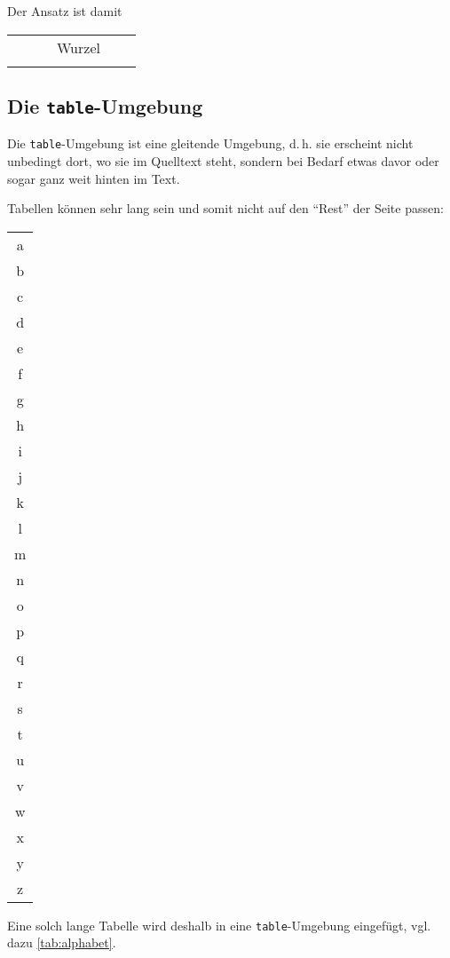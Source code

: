 \documentclass[ngerman,               %
               a4paper,               %
               fleqn,                 %
                     ]{scrartcl}       %
\begin{document}
Der Ansatz ist damit

\begin{tabular}{*{7}{p{1cm}}}  %
  \cline{4-5}         %
  &  & & \multicolumn{2}{|c|}{Wurzel} &  \\
  \cline{4-5}
  &  & & \multicolumn{1}{c|}{} & \\
\end{tabular}

\subsection{Die \texttt{table}-Umgebung}

Die \texttt{table}-Umgebung ist eine gleitende Umgebung, d.\,h. sie
erscheint nicht unbedingt dort, wo sie im Quelltext steht, sondern bei
Bedarf etwas davor oder sogar ganz weit hinten im Text.

Tabellen können sehr lang sein und somit nicht auf den "`Rest"' der Seite
passen:

\begin{tabular}{c}
  a\\
  b\\
  c\\
  d\\
  e\\
  f\\
  g\\
  h\\
  i\\
  j\\
  k\\
  l\\
  m\\
  n\\
  o\\
  p\\
  q\\
  r\\
  s\\
  t\\
  u\\
  v\\
  w\\
  x\\
  y\\
  z
\end{tabular}

Eine solch lange Tabelle wird deshalb in eine \texttt{table}-Umgebung
eingefügt, vgl. dazu \cref{tab:alphabet}.
\end{document}
